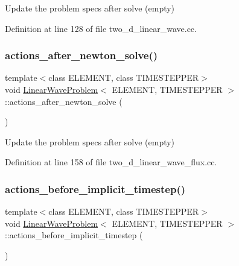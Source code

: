 Update the problem specs after solve (empty) 



Definition at line 128 of file two\+\_\+d\+\_\+linear\+\_\+wave.\+cc.

\mbox{\label{classLinearWaveProblem_a5b45c619af141b19162f990a95490e80}} 
\subsubsection{\texorpdfstring{actions\+\_\+after\+\_\+newton\+\_\+solve()}{actions\_after\_newton\_solve()}\hspace{0.1cm}{\footnotesize\ttfamily [2/2]}}
{\footnotesize\ttfamily template$<$class E\+L\+E\+M\+E\+NT, class T\+I\+M\+E\+S\+T\+E\+P\+P\+ER$>$ \\
void \hyperlink{classLinearWaveProblem}{Linear\+Wave\+Problem}$<$ E\+L\+E\+M\+E\+NT, T\+I\+M\+E\+S\+T\+E\+P\+P\+ER $>$\+::actions\+\_\+after\+\_\+newton\+\_\+solve (\begin{DoxyParamCaption}{ }\end{DoxyParamCaption})\hspace{0.3cm}{\ttfamily [inline]}}



Update the problem specs after solve (empty) 



Definition at line 158 of file two\+\_\+d\+\_\+linear\+\_\+wave\+\_\+flux.\+cc.

\mbox{\label{classLinearWaveProblem_a39cfcb8ce06463ace1ac09fa43afa00a}} 
\subsubsection{\texorpdfstring{actions\+\_\+before\+\_\+implicit\+\_\+timestep()}{actions\_before\_implicit\_timestep()}\hspace{0.1cm}{\footnotesize\ttfamily [1/2]}}
{\footnotesize\ttfamily template$<$class E\+L\+E\+M\+E\+NT, class T\+I\+M\+E\+S\+T\+E\+P\+P\+ER$>$ \\
void \hyperlink{classLinearWaveProblem}{Linear\+Wave\+Problem}$<$ E\+L\+E\+M\+E\+NT, T\+I\+M\+E\+S\+T\+E\+P\+P\+ER $>$\+::actions\+\_\+before\+\_\+implicit\+\_\+timestep (\begin{DoxyParamCaption}{ }\end{DoxyParamCaption})\hspace{0.3cm}{\ttfamily [inline]}}



